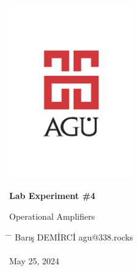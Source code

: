 \begin{center}
	\includegraphics[width=0.4\textwidth]{assets/agu.png}

	\Huge
	\textbf{Lab Experiment \#4}

	\vspace{0.3cm}
	\Huge
	Operational Amplifiers

	\vspace{0.8cm}
	\large
	\vspace{0.5cm}
	\LARGE
	\vspace{1.5cm}
	\textbf{}
	\vfill
	\vspace{0.8cm}
	\Large
\end{center}

\begin{tabbing}
	\hspace*{1em}\= \hspace*{8em} \= \kill
	\> Barış DEMİRCİ \> agu@338.rocks \\
	\> \> \\
	\> May 25, 2024 \> \\
\end{tabbing}
